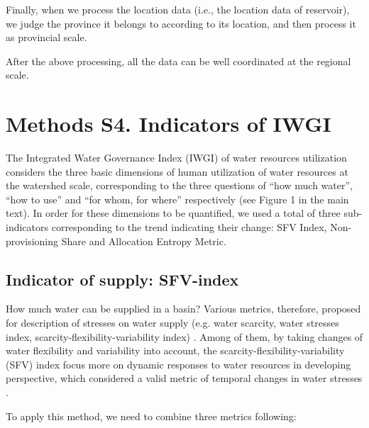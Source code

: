 \documentclass[9pt,twoside,lineno]{pnas-new}
\begin{document}
Finally, when we process the location data (i.e., the location data of reservoir), we judge the province it belongs to according to its location, and then process it as provincial scale.

After the above processing, all the data can be well coordinated at the regional scale.

\newpage
\section*{Methods S4. Indicators of IWGI}
The Integrated Water Governance Index (IWGI) of water resources utilization considers the three basic dimensions of human utilization of water resources at the watershed scale, corresponding to the three questions of ``how much water'', ``how to use'' and ``for whom, for where'' respectively (see Figure 1 in the main text).
In order for these dimensions to be quantified, we used a total of three sub-indicators corresponding to the trend indicating their change: SFV Index, Non-provisioning Share and Allocation Entropy Metric.

\subsection*{Indicator of supply: SFV-index}
	How much water can be supplied in a basin?
    Various metrics, therefore, proposed for description of stresses on water supply (e.g. water scarcity, water stresses index, scarcity-flexibility-variability index)
    \cite{qinFlexibilityintensityglobal2019,bestAnthropogenicstressesworld2019,florke2018}.
    Among of them, by taking changes of water flexibility and variability into account,	the scarcity-flexibility-variability (SFV) index focus more on dynamic responses to water resources in developing perspective, which considered a valid metric of temporal changes in water stresses \cite{qinFlexibilityintensityglobal2019}.

	To apply this method, we need to combine three metrics following:
\end{document}
